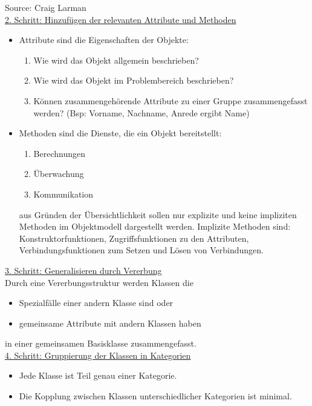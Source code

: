\begin{minipage}[c]{0.45\linewidth}
\begin{center}
\fi
\end{center}
\ifslides
\else
{\footnotesize Source: Craig Larman}\\[2ex]
\fi
\underline{2. Schritt: Hinzuf\"ugen der relevanten Attribute und Methoden}
\begin{itemize}
\item Attribute sind die Eigenschaften der Objekte:
\begin{enumerate}
\item Wie wird das Objekt allgemein beschrieben?
\item Wie wird das Objekt im Problembereich beschrieben?
\item Können zusammengehörende Attribute zu einer Gruppe
  zusammengefasst werden?
 (Bsp: Vorname, Nachname, Anrede ergibt Name)
\end{enumerate}
\item Methoden sind die Dienste, die ein Objekt bereitstellt:
\begin{enumerate}
\item Berechnungen
\item \"Uberwachung
\item Kommunikation
\end{enumerate}
aus Gründen der \"Ubersichtlichkeit sollen nur explizite und
keine impliziten Methoden im Objektmodell dargestellt werden.
Implizite Methoden sind: Konstruktorfunktionen, Zugriffsfunktionen zu den
  Attributen, Verbindungsfunktionen zum Setzen und L\"osen von Verbindungen.
\end{itemize}
\newpage
\underline{3. Schritt: Generalisieren durch Vererbung}\\[2ex]
Durch eine Vererbungsstruktur werden Klassen
die
\begin{itemize}
\item Spezialfälle einer andern Klasse sind oder
\item gemeinsame Attribute mit andern Klassen haben
\end{itemize}
in einer gemeinsamen Basisklasse zusammengefasst.\\[3ex]
\underline{4. Schritt: Gruppierung der Klassen in Kategorien}
\begin{itemize}
\item Jede Klasse ist Teil genau einer Kategorie.
\item Die Kopplung zwischen Klassen unterschiedlicher Kategorien ist minimal.
\end{itemize}
\ifslides
\newpage
\fi

\end{minipage}
